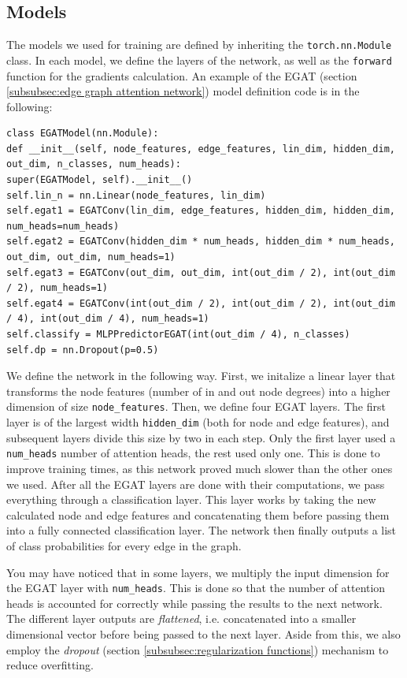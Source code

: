 \documentclass[times, utf8, diplomski, english]{fer_eng}
\begin{document}
\subsection{Models}

The models we used for training are defined by inheriting the \texttt{torch.nn.Module} class. In each model, we define the layers of the network, as well as the \texttt{forward} function for the gradients calculation. An example of the EGAT (section \ref{subsubsec:edge graph attention network}) model definition code is in the following:

\begin{lstlisting}
class EGATModel(nn.Module):
def __init__(self, node_features, edge_features, lin_dim, hidden_dim, out_dim, n_classes, num_heads):
super(EGATModel, self).__init__()
self.lin_n = nn.Linear(node_features, lin_dim)
self.egat1 = EGATConv(lin_dim, edge_features, hidden_dim, hidden_dim, num_heads=num_heads)
self.egat2 = EGATConv(hidden_dim * num_heads, hidden_dim * num_heads, out_dim, out_dim, num_heads=1)
self.egat3 = EGATConv(out_dim, out_dim, int(out_dim / 2), int(out_dim / 2), num_heads=1)
self.egat4 = EGATConv(int(out_dim / 2), int(out_dim / 2), int(out_dim / 4), int(out_dim / 4), num_heads=1)
self.classify = MLPPredictorEGAT(int(out_dim / 4), n_classes)
self.dp = nn.Dropout(p=0.5)
\end{lstlisting}

We define the network in the following way. First, we initalize a linear layer that transforms the node features (number of in and out node degrees) into a higher dimension of size \texttt{node\_features}. Then, we define four EGAT layers. The first layer is of the largest width \texttt{hidden\_dim} (both for node and edge features), and subsequent layers divide this size by two in each step. Only the first layer used a \texttt{num\_heads} number of attention heads, the rest used only one. This is done to improve training times, as this network proved much slower than the other ones we used. After all the EGAT layers are done with their computations, we pass everything through a classification layer. This layer works by taking the new calculated node and edge features and concatenating them before passing them into a fully connected classification layer. The network then finally outputs a list of class probabilities for every edge in the graph.

You may have noticed that in some layers, we multiply the input dimension for the EGAT layer with \texttt{num\_heads}. This is done so that the number of attention heads is accounted for correctly while passing the results to the next network. The different layer outputs are \textit{flattened}, i.e. concatenated into a smaller dimensional vector before being passed to the next layer. Aside from this, we also employ the \textit{dropout} (section \ref{subsubsec:regularization functions}) mechanism to reduce overfitting.
\end{document}
